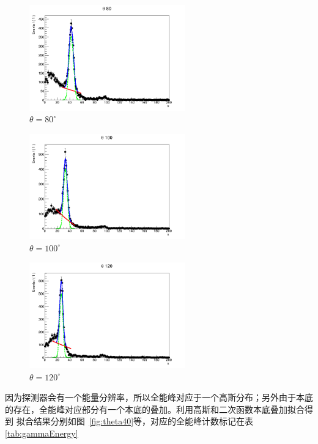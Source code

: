\documentclass[10pt]{ctexart}
\begin{document}
\begin{figure}
    \centering
    \includegraphics[width=0.6\textwidth]{data/80.png}
    \caption{$\theta=80^\circ$}
    \label{fig:theta80}
\end{figure}
\begin{figure}
    \centering
    \includegraphics[width=0.6\textwidth]{data/100.png}
    \caption{$\theta=100^\circ$}
    \label{fig:theta100}
\end{figure}
\begin{figure}
    \centering
    \includegraphics[width=0.6\textwidth]{data/120.png}
    \caption{$\theta=120^\circ$}
    \label{fig:theta120}
\end{figure}
因为探测器会有一个能量分辨率，所以全能峰对应于一个高斯分布；另外由于本底的存在，全能峰对应部分有一个本底的叠加。利用高斯和二次函数本底\cite{nuclear}叠加拟合得到
拟合结果分别如图~\ref{fig:theta40}等，对应的全能峰计数标记在表\ref{tab:gammaEnergy}
\end{document}

